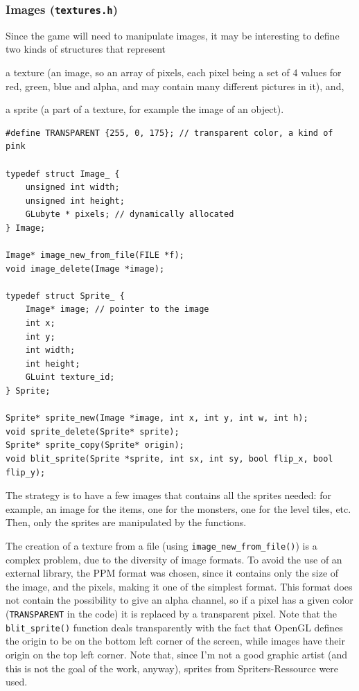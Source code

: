 \documentclass[12pt,a4paper]{article}
\newcommand{\cc}[1]{\texttt{#1}}
\begin{document}
\subsubsection{Images (\texttt{textures.h})}

Since the game will need to manipulate images, it may be interesting to define two kinds of structures that represent \begin{inparaenum}[i)]
\item a texture (an image, so an array of pixels, each pixel being a set of 4 values for red, green, blue and alpha, and may contain many different pictures in it), and,
\item a sprite (a part of a texture, for example the image of an object).
\end{inparaenum}

\begin{verbatim}
#define TRANSPARENT {255, 0, 175}; // transparent color, a kind of pink

typedef struct Image_ {
	unsigned int width;
	unsigned int height;
	GLubyte * pixels; // dynamically allocated
} Image;

Image* image_new_from_file(FILE *f);
void image_delete(Image *image);

typedef struct Sprite_ {
	Image* image; // pointer to the image
	int x;
	int y;
	int width;
	int height;
	GLuint texture_id;
} Sprite;

Sprite* sprite_new(Image *image, int x, int y, int w, int h);
void sprite_delete(Sprite* sprite);
Sprite* sprite_copy(Sprite* origin);
void blit_sprite(Sprite *sprite, int sx, int sy, bool flip_x, bool flip_y);
\end{verbatim}

The strategy is to have a few images that contains all the sprites needed: for example, an image for the items, one for the monsters, one for the level tiles, etc. Then, only the sprites are manipulated by the functions.

The creation of a texture from a file (using \cc{image_new_from_file()}) is a complex problem, due to the diversity of image formats. To avoid the use of an external library, the PPM format \cite{ppmformat} was chosen, since it contains only the size of the image, and the pixels, making it one of the simplest format. This format does not contain the possibility to give an alpha channel, so if a pixel has a given color (\cc{TRANSPARENT} in the code) it is replaced by a transparent pixel. Note that the \cc{blit_sprite()} function deals transparently with the fact that OpenGL defines the origin to be on the bottom left corner of the screen, while images have their origin on the top left corner. Note that, since I'm not a good graphic artist (and this is not the goal of the work, anyway), sprites from Spriters-Ressource \cite{spriters} were used.
\end{document}
